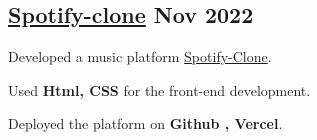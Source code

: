 \subsection{{\href{https://spotify-clone-anmolkgupta.vercel.app}{Spotify-clone} \hfill Nov 2022}}
\begin{zitemize}
\item Developed a music platform \href{https://spotify-clone-anmolkgupta.vercel.app}{Spotify-Clone}.
\item Used \textbf{Html, CSS} for the front-end development.
\item Deployed the platform on \textbf{Github , Vercel}.
\end{zitemize}


